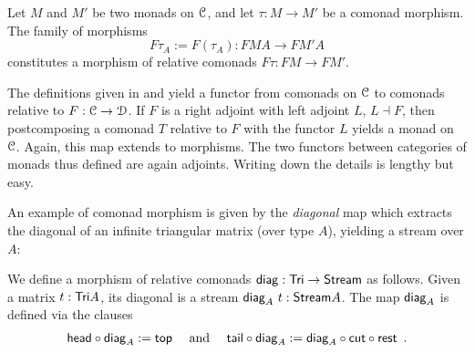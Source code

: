 \documentclass[a4paper,USenglish]{lipics}
\begin{document}
\begin{Long}

\begin{ex}\label{ex_relcom_from_com_morphism}
 Let $M$ and $M'$ be two monads on ${\mathcal{C}}$, and let $\tau : M \to M'$ be a comonad morphism. 
 The family of morphisms \[F\tau_A := F(\tau_A) : FMA \to FM'A\] constitutes a morphism of 
 relative comonads $F\tau : FM\to FM'$.
\end{ex}


\begin{rem}
 The definitions given in  and  yield a functor from 
 comonads on ${\mathcal{C}}$ to comonads relative to $F:{\mathcal{C}}\to\mathcal{D}$. 
 If $F$ is a right adjoint with left adjoint $L$, $L\dashv F$, then postcomposing a comonad $T$ relative to $F$ with the functor $L$
 yields a monad on ${\mathcal{C}}$. Again, this map extends to morphisms.
 The two functors between categories of monads thus defined are again adjoints.
 Writing down the details is lengthy but easy.
 
\end{rem}

\end{Long}


An example of comonad morphism is given by the \emph{diagonal} map which extracts the diagonal of an infinite triangular matrix (over type $A$),
yielding a stream over $A$:

\begin{ex}\label{ex_diag}
We define a morphism of relative comonads $\mathsf{diag} : \mathsf{Tri} \to \mathsf{Stream}$ as follows.
Given a matrix $t : \mathsf{Tri} A$, its diagonal is a stream $\mathsf{diag}_A~t : \mathsf{Stream} A$.
The map $\mathsf{diag}_A$ is defined via the clauses
\begin{align*} \comp{\diagonal_A}{\shead} := \head \quad\text{ and } \quad %
                  \comp{\diagonal_A}{\stail} := \comp{\comp{\tail}{\cut}}{\diagonal_A} \enspace . %
    \end{align*}
\end{ex}
\end{document}
